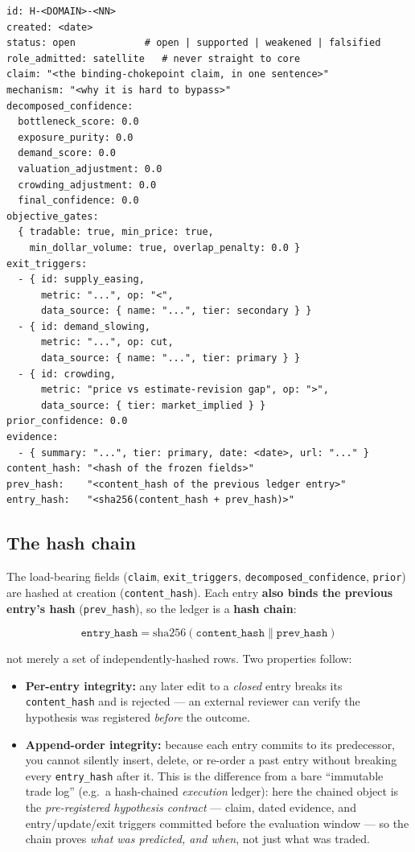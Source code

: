 \documentclass[11pt]{article}
\begin{document}
\noindent\begin{minipage}{\linewidth}\footnotesize
\begin{verbatim}
id: H-<DOMAIN>-<NN>
created: <date>
status: open            # open | supported | weakened | falsified
role_admitted: satellite   # never straight to core
claim: "<the binding-chokepoint claim, in one sentence>"
mechanism: "<why it is hard to bypass>"
decomposed_confidence:
  bottleneck_score: 0.0
  exposure_purity: 0.0
  demand_score: 0.0
  valuation_adjustment: 0.0
  crowding_adjustment: 0.0
  final_confidence: 0.0
objective_gates:
  { tradable: true, min_price: true,
    min_dollar_volume: true, overlap_penalty: 0.0 }
exit_triggers:
  - { id: supply_easing,
      metric: "...", op: "<",
      data_source: { name: "...", tier: secondary } }
  - { id: demand_slowing,
      metric: "...", op: cut,
      data_source: { name: "...", tier: primary } }
  - { id: crowding,
      metric: "price vs estimate-revision gap", op: ">",
      data_source: { tier: market_implied } }
prior_confidence: 0.0
evidence:
  - { summary: "...", tier: primary, date: <date>, url: "..." }
content_hash: "<hash of the frozen fields>"
prev_hash:    "<content_hash of the previous ledger entry>"
entry_hash:   "<sha256(content_hash + prev_hash)>"
\end{verbatim}
\end{minipage}

\subsection*{The hash chain}

The load-bearing fields (\texttt{claim}, \texttt{exit\_triggers},
\texttt{decomposed\_confidence}, \texttt{prior}) are hashed at creation (\texttt{content\_hash}).
Each entry \textbf{also binds the previous entry's hash} (\texttt{prev\_hash}), so the ledger is a
\textbf{hash chain}:

\[
  \texttt{entry\_hash} = \mathrm{sha256}(\texttt{content\_hash} \mathbin{\|} \texttt{prev\_hash})
\]

not merely a set of independently-hashed rows. Two properties follow:

\begin{itemize}
  \item \textbf{Per-entry integrity:} any later edit to a \emph{closed} entry breaks its
    \texttt{content\_hash} and is rejected --- an external reviewer can verify the hypothesis was
    registered \emph{before} the outcome.
  \item \textbf{Append-order integrity:} because each entry commits to its predecessor, you cannot
    silently insert, delete, or re-order a past entry without breaking every \texttt{entry\_hash}
    after it. This is the difference from a bare ``immutable trade log'' (e.g.\ a hash-chained
    \emph{execution} ledger): here the chained object is the \emph{pre-registered hypothesis
    contract} --- claim, dated evidence, and entry/update/exit triggers committed before the
    evaluation window --- so the chain proves \emph{what was predicted, and when}, not just what
    was traded.
\end{itemize}
\end{document}
